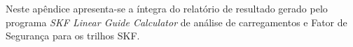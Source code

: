 \label{append::skf}

Neste apêndice apresenta-se a íntegra do relatório de resultado gerado pelo
programa \textit{SKF Linear Guide Calculator} de análise de carregamentos e 
Fator de Segurança para os trilhos SKF.


